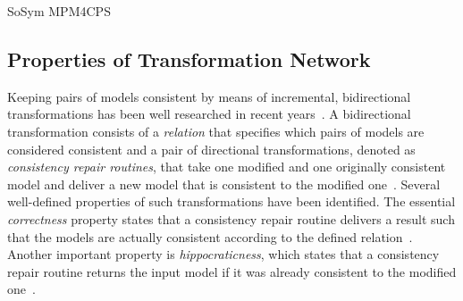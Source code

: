 \begin{copiedFrom}{SoSym MPM4CPS}
\subsection{Properties of Transformation Network}
\label{sec:compatibility:networkproperties}

Keeping pairs of models consistent by means of incremental, bidirectional transformations has been well researched in recent years~\cite{stevens2010sosym, etzlstorfer2013a, cleve2019dagstuhl}.
A bidirectional transformation consists of a \emph{relation} that specifies which pairs of models are considered consistent and a pair of directional transformations, denoted as \emph{consistency repair routines}, that take one modified and one originally consistent model and deliver a new model that is consistent to the modified one~\cite{stevens2010sosym}.
Several well-defined properties of such transformations have been identified.
The essential \emph{correctness} property states that a consistency repair routine delivers a result such that the models are actually consistent according to the defined relation~\cite{stevens2010sosym}.
Another important property is \emph{hippocraticness}, which states that a consistency repair routine returns the input model if it was already consistent to the modified one~\cite{stevens2010sosym}.


\end{copiedFrom}
